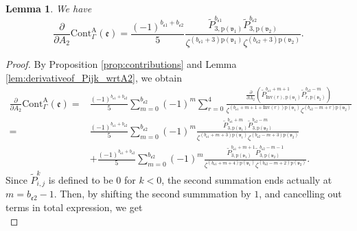 \documentclass[12pt]{amsart}
\newtheorem{lem}[prop]{Lemma}
\numberwithin{equation}{section}
\begin{document}
\begin{lem}\label{lem:A2_derivative_of_edge}
We have
\begin{equation*} 
    \frac{\partial}{\partial A_{2}}\mathrm{Cont}_{\Gamma}^{\mathrm{A}}(\mathfrak{e})
    =\frac{(-1)^{b_{\mathfrak{e}1}+b_{\mathfrak{e}2}}}{5} \frac{\widetilde{P}_{3,\mathrm{p}(\mathfrak{v}_1)}^{b_{\mathfrak{e}1}}\widetilde{P}_{3,\mathrm{p}(\mathfrak{v}_2)}^{b_{\mathfrak{e}2}}}{\zeta^{(b_{\mathfrak{e}1}+3)\mathrm{p}(\mathfrak{v}_1)}\zeta^{(b_{\mathfrak{e}2}+3)\mathrm{p}(\mathfrak{v}_2)}}.
\end{equation*}
\end{lem}
\begin{proof}
By Proposition \ref{prop:contributions} and Lemma \ref{lem:derivativeof_Pijk_wrtA2}, we obtain
\begin{equation*}
\begin{aligned}
    \frac{\partial}{\partial A_2}\mathrm{Cont}_{\Gamma}^{\mathrm{A}}(\mathfrak{e})
    =&\frac{(-1)^{b_{\mathfrak{e}1}+b_{\mathfrak{e}2}}}{5} \sum_{m=0}^{b_{\mathfrak{e}2}}(-1)^{m} \sum_{r=0}^{4}\frac{\frac{\partial}{\partial A_2}\left(\widetilde{P}_{\mathrm{Inv}(r),\mathrm{p}(\mathfrak{v}_1)}^{b_{\mathfrak{e}1}+m+1}\widetilde{P}_{r,\mathrm{p}(\mathfrak{v}_2)}^{b_{\mathfrak{e}2}-m}\right)}{\zeta^{(b_{\mathfrak{e}1}+m+1+\mathrm{Inv}(r))\mathrm{p}(\mathfrak{v}_1)}\zeta^{(b_{\mathfrak{e}2}-m+r)\mathrm{p}(\mathfrak{v}_2)}}\\
    =&\frac{(-1)^{b_{\mathfrak{e}1}+b_{\mathfrak{e}2}}}{5} \sum_{m=0}^{b_{\mathfrak{e}2}}(-1)^{m} \frac{\widetilde{P}_{3,\mathrm{p}(\mathfrak{v}_1)}^{b_{\mathfrak{e}1}+m}\widetilde{P}_{3,\mathrm{p}(\mathfrak{v}_2)}^{b_{\mathfrak{e}2}-m}}{\zeta^{(b_{\mathfrak{e}1}+m+3)\mathrm{p}(\mathfrak{v}_1)}\zeta^{(b_{\mathfrak{e}2}-m+3)\mathrm{p}(\mathfrak{v}_2)}}\\
    &+\frac{(-1)^{b_{\mathfrak{e}1}+b_{\mathfrak{e}2}}}{5} \sum_{m=0}^{b_{\mathfrak{e}2}}(-1)^{m}\frac{\widetilde{P}_{3,\mathrm{p}(\mathfrak{v}_1)}^{b_{\mathfrak{e}1}+m+1}\widetilde{P}_{3,\mathrm{p}(\mathfrak{v}_2)}^{b_{\mathfrak{e}2}-m-1}}{\zeta^{(b_{\mathfrak{e}1}+m+4)\mathrm{p}(\mathfrak{v}_1)}\zeta^{(b_{\mathfrak{e}2}-m+2)\mathrm{p}(\mathfrak{v}_2)}}.
\end{aligned}
\end{equation*}
Since $\widetilde{P}_{i,j}^k$ is defined to be $0$ for $k<0$, the second summation ends actually at $m=b_{\mathfrak{e}2}-1$. Then, by shifting the second summmation by $1$, and cancelling out terms in total expression, we get
\begin{equation*}

\end{equation*}
\end{proof}
\end{document}
